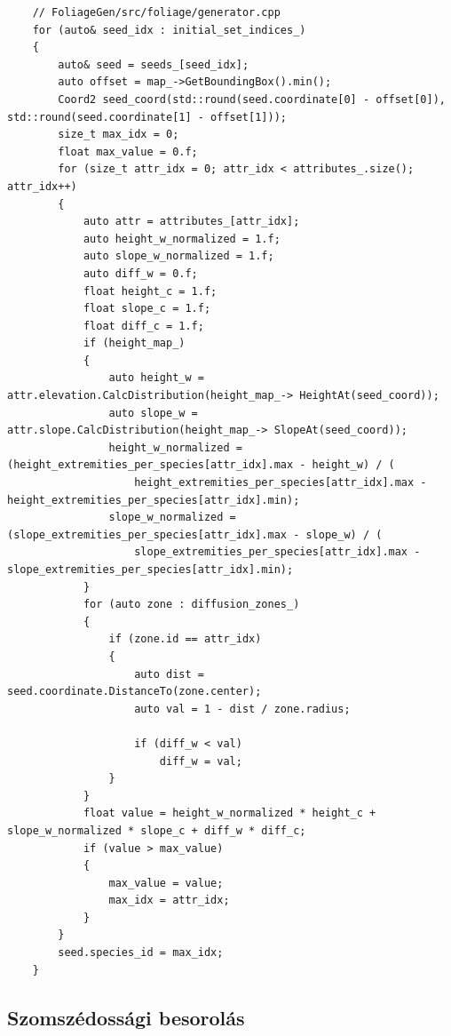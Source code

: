 \begin{listing}[H]
\begin{verbatim}
    // FoliageGen/src/foliage/generator.cpp
    for (auto& seed_idx : initial_set_indices_)
    {
        auto& seed = seeds_[seed_idx];
        auto offset = map_->GetBoundingBox().min();
        Coord2 seed_coord(std::round(seed.coordinate[0] - offset[0]), std::round(seed.coordinate[1] - offset[1]));
        size_t max_idx = 0;
        float max_value = 0.f;
        for (size_t attr_idx = 0; attr_idx < attributes_.size(); attr_idx++)
        {
            auto attr = attributes_[attr_idx];
            auto height_w_normalized = 1.f;
            auto slope_w_normalized = 1.f;
            auto diff_w = 0.f;
            float height_c = 1.f;
            float slope_c = 1.f;
            float diff_c = 1.f;
            if (height_map_)
            {
                auto height_w = attr.elevation.CalcDistribution(height_map_-> HeightAt(seed_coord));
                auto slope_w = attr.slope.CalcDistribution(height_map_-> SlopeAt(seed_coord));
                height_w_normalized = (height_extremities_per_species[attr_idx].max - height_w) / (
                    height_extremities_per_species[attr_idx].max - height_extremities_per_species[attr_idx].min);
                slope_w_normalized = (slope_extremities_per_species[attr_idx].max - slope_w) / (
                    slope_extremities_per_species[attr_idx].max - slope_extremities_per_species[attr_idx].min);
            }
            for (auto zone : diffusion_zones_)
            {
                if (zone.id == attr_idx)
                {
                    auto dist = seed.coordinate.DistanceTo(zone.center);
                    auto val = 1 - dist / zone.radius;

                    if (diff_w < val)
                        diff_w = val;
                }
            }
            float value = height_w_normalized * height_c + slope_w_normalized * slope_c + diff_w * diff_c;
            if (value > max_value)
            {
                max_value = value;
                max_idx = attr_idx;
            }
        }
        seed.species_id = max_idx;
    }
\end{verbatim}
\caption{A kezdeti halmaz egyedei a térbeli helyzetükből kiindulóan a legnagyobb valószínűségű faj tagjának vannak véve.}
\label{code:initial}
\end{listing}

\subsection{Szomszédossági besorolás}

